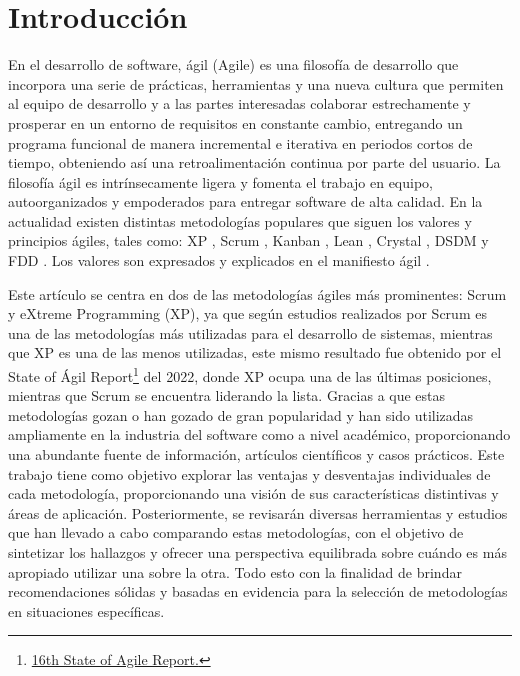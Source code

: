 \documentclass[a4paper,10pt]{article}
\begin{document}
	\section{Introducción}
	En el desarrollo de software, ágil (Agile) es una filosofía de desarrollo que incorpora una serie de prácticas, herramientas y una nueva cultura que permiten al equipo de desarrollo y a las partes interesadas colaborar estrechamente y prosperar en un entorno de requisitos en constante cambio, entregando un programa funcional de manera incremental e iterativa en periodos cortos de tiempo, obteniendo así una retroalimentación continua por parte del usuario. La filosofía ágil es intrínsecamente ligera y fomenta el trabajo en equipo, autoorganizados y empoderados para entregar software de alta calidad. En la actualidad existen distintas metodologías populares que siguen los valores y principios ágiles, tales como: XP \parencite{Beck_Andres_2005}, Scrum \parencite{sutherland2014scrum}, Kanban \parencite{anderson2010kanban}, Lean \parencite{poppendieck2003lean}, Crystal \parencite{cockburn2004crystal}, DSDM \parencite{stapleton1997dynamic} y FDD \parencite{palmer2001practical}. Los valores son expresados y explicados en el manifiesto ágil \parencite{Manifesto_for_Agile_Software_Development}.
	
	Este artículo se centra en dos de las metodologías ágiles más prominentes: Scrum y eXtreme Programming (XP), ya que según estudios realizados por \textcite{fuior2019key} Scrum es una de las metodologías más utilizadas para el desarrollo de sistemas, mientras que XP es una de las menos utilizadas, este mismo resultado fue obtenido por el State of Ágil Report\footnote{\href{https://info.digital.ai/rs/981-LQX-968/images/SOA16.pdf}{16th State of Agile Report.}} del 2022, donde XP ocupa una de las últimas posiciones, mientras que Scrum se encuentra liderando la lista. Gracias a que estas metodologías gozan o han gozado de gran popularidad y han sido utilizadas ampliamente en la industria del software como a nivel académico, proporcionando una abundante fuente de información, artículos científicos y casos prácticos. Este trabajo tiene como objetivo explorar las ventajas y desventajas individuales de cada metodología, proporcionando una visión de sus características distintivas y áreas de aplicación. Posteriormente, se revisarán diversas herramientas y estudios que han llevado a cabo comparando estas metodologías, con el objetivo de sintetizar los hallazgos y ofrecer una perspectiva equilibrada sobre cuándo es más apropiado utilizar una sobre la otra. Todo esto con la finalidad de brindar recomendaciones sólidas y basadas en evidencia para la selección de metodologías en situaciones específicas.
\end{document}
